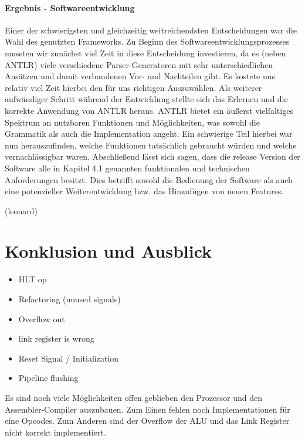 \documentclass[paper=a4,fontsize=12pt,twocolumn]{scrreprt}
\begin{document}
\subsubsection{Ergebnis - Softwareentwicklung}
Einer der schwierigsten und gleichzeitig weitreichendsten Entscheidungen war die Wahl des genutzten Frameworks. Zu Beginn des Softwareentwicklungsprozesses mussten wir zunächst viel Zeit in diese Entscheidung investieren, da es (neben ANTLR) viele verschiedene Parser-Generatoren mit sehr unterschiedlichen Ansätzen und damit verbundenen Vor- und Nachteilen gibt. Es kostete uns relativ viel Zeit hierbei den für uns richtigen Auszuwählen. %
Als weiterer aufwändiger Schritt während der Entwicklung stellte sich das Erlernen und die korrekte Anwendung von ANTLR heraus. ANTLR bietet ein äußerst vielfaltiges Spektrum an nutzbaren Funktionen und Möglichkeiten, was sowohl die Grammatik als auch die Implementation angeht. Ein schwierige Teil hierbei war nun herauszufinden, welche Funktionen tatsächlich gebraucht würden und welche vernachlässigbar waren. %
Abschließend lässt sich sagen, dass die release Version der Software alle in Kapitel 4.1 %
genannten funktionalen und technischen Anforderungen besitzt. Dies betrifft sowohl die Bedienung  der Software als auch eine potenzieller Weiterentwicklung bzw. das Hinzufügen von neuen Features. 

(leonard)


\chapter{Konklusion und Ausblick}
\begin{itemize}
    \item HLT op
    \item Refactoring (unused signals)
    \item Overflow out
    \item link register is wrong
    \item Reset Signal / Initialization
    \item Pipeline flushing
\end{itemize}


Es sind noch viele Möglichkeiten offen geblieben den Prozessor und den Assembler-Compiler auszubauen.
Zum Einen fehlen noch Implementationen für eine Opcodes. %
Zum Anderen sind der Overflow der ALU und das Link Register nicht korrekt implementiert.
\end{document}
